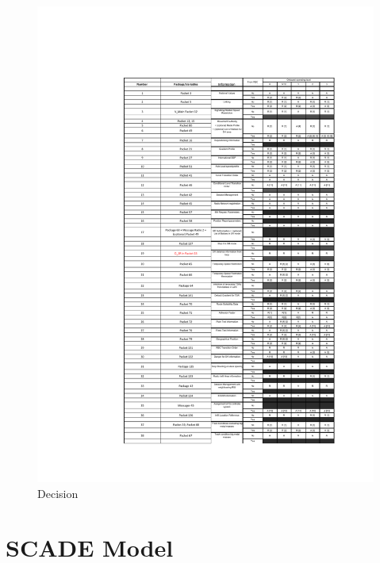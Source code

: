 \documentclass{template/openetcs_report}
\begin{document}
\begin{figure}[hbtp]
\centering
\includegraphics [scale=0.7]{images/Decisionsonfilter}
\caption{Decision}
\end{figure}
 \newpage

\section{SCADE Model}





 
\appendix




\newpage
{}
\printindex
\end{document}
